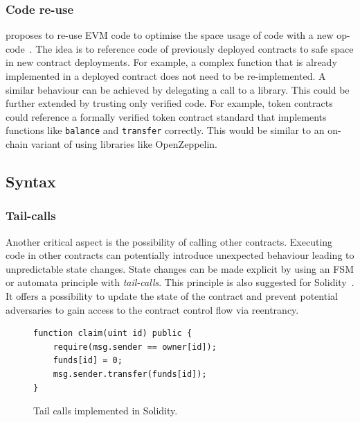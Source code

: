 \subsubsection{Code re-use}
\citeauthor{Pontiveros2018} proposes to re-use EVM code to optimise the space usage of code with a new op-code~\cite{Pontiveros2018}. 
The idea is to reference code of previously deployed contracts to safe space in new contract deployments.
For example, a complex function that is already implemented in a deployed contract does not need to be re-implemented.
A similar behaviour can be achieved by delegating a call to a library.
This could be further extended by trusting only verified code.
For example, token contracts could reference a formally verified token contract standard that implements functions like \texttt{balance} and \texttt{transfer} correctly.
This would be similar to an on-chain variant of using libraries like OpenZeppelin.

\subsection{Syntax}
\subsubsection{Tail-calls}
Another critical aspect is the possibility of calling other contracts. Executing code in other contracts can potentially introduce unexpected behaviour leading to unpredictable state changes. State changes can be made explicit by using an FSM or automata principle with \emph{tail-calls}. This principle is also suggested for Solidity~\cite{ConsenSys2018Security}.
It offers a possibility to update the state of the contract and prevent potential adversaries to gain access to the contract control flow via reentrancy.

\begin{figure}[!h]
\begin{lstlisting}[language=Solidity]
function claim(uint id) public {
    require(msg.sender == owner[id]);
    funds[id] = 0;
    msg.sender.transfer(funds[id]);
}
\end{lstlisting}
\caption{Tail calls implemented in Solidity.}
\label{lst:tail-call}
\end{figure}



